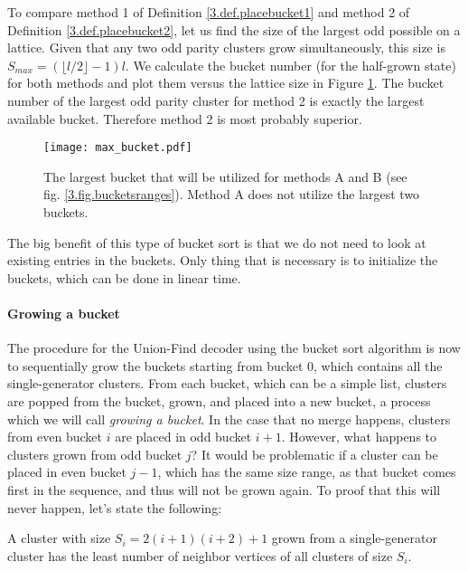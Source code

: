 To compare method 1 of Definition \ref{3.def.placebucket1} and method 2 of Definition \ref{3.def.placebucket2}, let us find the size of the largest odd possible on a lattice. Given that any two odd parity clusters grow simultaneously, this size is $S_{max} = (\lfloor l/2\rfloor-1)l$. We calculate the bucket number (for the half-grown state) for both methods and plot them versus the lattice size in Figure \ref{3.fig.maxbucket}. The bucket number of the largest odd parity cluster for method 2 is exactly the largest available bucket. Therefore method 2 is most probably superior.

\begin{figure}[htbp]
  \centering
  \texttt{[image: max\_bucket.pdf]}
  \caption{The largest bucket that will be utilized for methods A and B (see fig. \ref{3.fig.bucketsranges}). Method A does not utilize the largest two buckets. }\label{3.fig.maxbucket}
\end{figure}

The big benefit of this type of bucket sort is that we do not need to look at existing entries in the buckets. Only thing that is necessary is to initialize the buckets, which can be done in linear time.

\paragraph{Growing a bucket}

The procedure for the Union-Find decoder using the bucket sort algorithm is now to sequentially grow the buckets starting from bucket 0, which contains all the single-generator clusters. From each bucket, which can be a simple list, clusters are popped from the bucket, grown, and placed into a new bucket, a process which we will call \emph{growing a bucket}. In the case that no merge happens, clusters from even bucket $i$ are placed in odd bucket $i+1$. However, what happens to clusters grown from odd bucket $j$? It would be problematic if a cluster can be placed in even bucket $j-1$, which has the same size range, as that bucket comes first in the sequence, and thus will not be grown again. To proof that this will never happen, let's state the following:

\begin{lemma}
  A cluster with size $S_i = 2(i+1)(i+2) + 1$ grown from a single-generator cluster has the least number of neighbor vertices of all clusters of size $S_i$.
\end{lemma}

